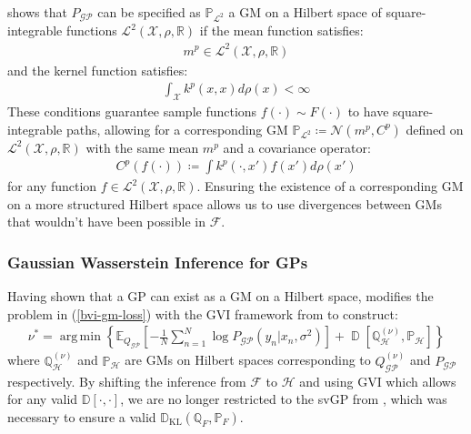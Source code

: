 \documentclass{article}
\newcommand{\KLD}{\operatorname{\mathbb{D}_{KL}}}
\newcommand{\D}{\operatorname{\mathbb{D}}}
\newcommand{\GP}{\operatorname{\mathcal{GP}}}
\DeclareMathOperator*{\argmin}{arg\,min}
\numberwithin{equation}{section}
\begin{document}
\cite{wild2022generalized} shows that $P_{\GP}$ can be specified as $\mathbb{P}_{\mathcal{L}^2}$ a GM on a Hilbert space of square-integrable functions $\mathcal{L}^2(\mathcal{X}, \rho, \mathbb{R})$ if the mean function satisfies:
\begin{align}
    \label{smooth-mean-function-condition}
    m^p \in \mathcal{L}^2(\mathcal{X}, \rho, \mathbb{R})
\end{align}
and the kernel function satisfies:
\begin{align}
    \int_{\mathcal{X}} k^p(x, x) d\rho(x) < \infty
    \label{trace-kernel-condition}
\end{align}
These conditions guarantee sample functions $f(\cdot) \sim F(\cdot)$ to have square-integrable paths, allowing for a corresponding GM $\mathbb{P}_{\mathcal{L}^2} \coloneqq \mathcal{N}(m^p, C^p)$ defined on $\mathcal{L}^2(\mathcal{X}, \rho, \mathbb{R})$ with the same mean $m^p$ and a covariance operator:
\begin{align}
    C^p(f(\cdot)) \coloneqq \int k^p(\cdot, x')f(x')d \rho(x')
    \label{gm-covariance-operator}
\end{align}
for any function $f \in \mathcal{L}^2(\mathcal{X}, \rho, \mathbb{R})$. Ensuring the existence of a corresponding GM on a more structured Hilbert space allows us to use divergences between GMs that wouldn't have been possible in $\mathcal{F}$. 

\subsubsection{Gaussian Wasserstein Inference for GPs}
Having shown that a GP can exist as a GM on a Hilbert space, \cite{wild2022generalized} modifies the problem in (\ref{bvi-gm-loss}) with the GVI framework from \cite{knoblauch2022optimization} to construct:
\begin{align}
    \label{gwi-objective}
    \nu^* = \argmin\left\{ \mathbb{E}_{Q_{\GP}}\left[- \frac{1}{N}\sum_{n=1}^N \log P_{\GP}\left(y_n \vert x_n, \sigma^2\right) \right] + \D \left[\mathbb{Q}^{(\nu)}_{\mathcal{H}}, \mathbb{P}_{\mathcal{H}} \right]\right\}
\end{align}
where $\mathbb{Q}^{(\nu)}_{\mathcal{H}}$ and $\mathbb{P}_{\mathcal{H}}$ are GMs on Hilbert spaces corresponding to $Q^{(\nu)}_{\GP}$ and $P_{\GP}$ respectively. By shifting the inference from $\mathcal{F}$ to $\mathcal{H}$ and using GVI which allows for any valid $\mathbb{D}[\cdot, \cdot]$, we are no longer restricted to the svGP from \cite{titsias2009variational}, which was necessary to ensure a valid $\KLD(\mathbb{Q}_{F},  \mathbb{P}_{F})$. 
\end{document}
